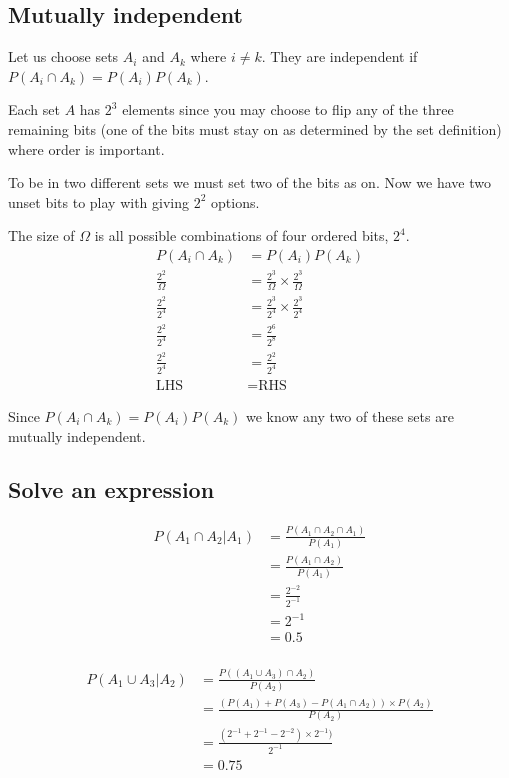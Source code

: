 \documentclass{article}
\begin{document}
\subsection{Mutually independent}
Let us choose sets $A_i$ and $A_k$ where $i \neq k$. They are independent if
$P(A_i \cap A_k) = P(A_i)P(A_k)$.

Each set $A$ has $2^3$ elements since you may choose to flip any of the three
remaining bits (one of the bits must stay on as determined by the set
definition) where order is important.

To be in two different sets we must set two of the bits as on. Now we have
two unset bits to play with giving $2^2$ options.

The size of $\Omega$ is all possible combinations of four ordered bits, $2^4$.
\begin{align*}
    P(A_i \cap A_k) &= P(A_i)P(A_k) \\
    \frac{2^2}{\Omega} &= \frac{2^3}{\Omega} \times \frac{2^3}{\Omega} \\
    \frac{2^2}{2^4} &= \frac{2^3}{2^4} \times \frac{2^3}{2^4} \\
    \frac{2^2}{2^4} &= \frac{2^6}{2^8} \\
    \frac{2^2}{2^4} &= \frac{2^2}{2^4} \\
    \text{LHS} &= \text{RHS}
\end{align*}

Since $P(A_i \cap A_k) = P(A_i)P(A_k)$ we know any two of these sets are
mutually independent.

\subsection{Solve an expression}
\begin{align*}
    P(A_1 \cap A_2 | A_1) &= \frac{P(A_1 \cap A_2 \cap A_1)}{P(A_1)} \\
    &= \frac{P(A_1 \cap A_2)}{P(A_1)} \\
    &= \frac{2^{-2}}{2^{-1}} \\
    &= 2^{-1} \\
    &= 0.5 \\
\end{align*}

\begin{align*}
    P(A_1 \cup A_3 | A_2) &= \frac{P((A_1 \cup A_3) \cap A_2)}{P(A_2)} \\
    &= \frac{(P(A_1) + P(A_3) - P(A_1 \cap A_2)) \times P(A_2)}{P(A_2)} \\
    &= \frac{(2^{-1} + 2^{-1} - 2^{-2}) \times 2^{-1})}{2^{-1}} \\
    &= 0.75 \\
\end{align*}
\end{document}
